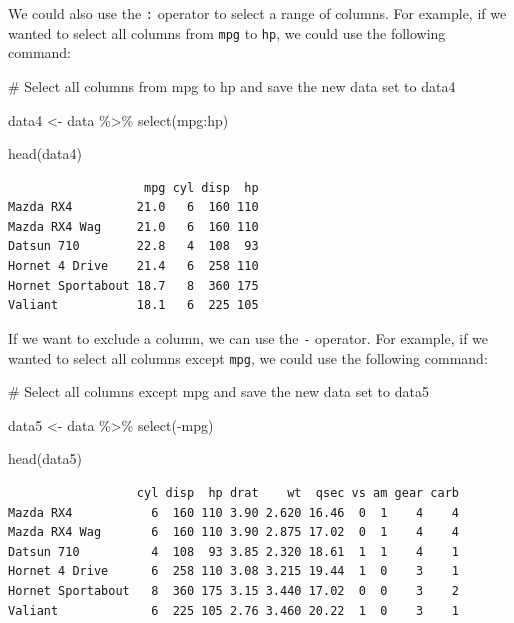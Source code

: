 \documentclass[
  letterpaper,
  DIV=11,
  numbers=noendperiod]{scrreprt}
\newenvironment{Shaded}{\begin{snugshade}}{\end{snugshade}}
\newcommand{\CommentTok}[1]{\textcolor[rgb]{0.37,0.37,0.37}{#1}}
\newcommand{\FunctionTok}[1]{\textcolor[rgb]{0.28,0.35,0.67}{#1}}
\newcommand{\NormalTok}[1]{\textcolor[rgb]{0.00,0.23,0.31}{#1}}
\newcommand{\OtherTok}[1]{\textcolor[rgb]{0.00,0.23,0.31}{#1}}
\newcommand{\SpecialCharTok}[1]{\textcolor[rgb]{0.37,0.37,0.37}{#1}}
\begin{document}
We could also use the \texttt{:} operator to select a range of columns.
For example, if we wanted to select all columns from \texttt{mpg} to
\texttt{hp}, we could use the following command:

\begin{Shaded}
\begin{Highlighting}[]
\CommentTok{\# Select all columns from mpg to hp and save the new data set to data4}

\NormalTok{data4 }\OtherTok{\textless{}{-}}\NormalTok{ data }\SpecialCharTok{\%\textgreater{}\%}
  \FunctionTok{select}\NormalTok{(mpg}\SpecialCharTok{:}\NormalTok{hp)}

\FunctionTok{head}\NormalTok{(data4)}
\end{Highlighting}
\end{Shaded}

\begin{verbatim}
                   mpg cyl disp  hp
Mazda RX4         21.0   6  160 110
Mazda RX4 Wag     21.0   6  160 110
Datsun 710        22.8   4  108  93
Hornet 4 Drive    21.4   6  258 110
Hornet Sportabout 18.7   8  360 175
Valiant           18.1   6  225 105
\end{verbatim}

If we want to exclude a column, we can use the \texttt{-} operator. For
example, if we wanted to select all columns except \texttt{mpg}, we
could use the following command:

\begin{Shaded}
\begin{Highlighting}[]
\CommentTok{\# Select all columns except mpg and save the new data set to data5}

\NormalTok{data5 }\OtherTok{\textless{}{-}}\NormalTok{ data }\SpecialCharTok{\%\textgreater{}\%}
  \FunctionTok{select}\NormalTok{(}\SpecialCharTok{{-}}\NormalTok{mpg)}

\FunctionTok{head}\NormalTok{(data5)}
\end{Highlighting}
\end{Shaded}

\begin{verbatim}
                  cyl disp  hp drat    wt  qsec vs am gear carb
Mazda RX4           6  160 110 3.90 2.620 16.46  0  1    4    4
Mazda RX4 Wag       6  160 110 3.90 2.875 17.02  0  1    4    4
Datsun 710          4  108  93 3.85 2.320 18.61  1  1    4    1
Hornet 4 Drive      6  258 110 3.08 3.215 19.44  1  0    3    1
Hornet Sportabout   8  360 175 3.15 3.440 17.02  0  0    3    2
Valiant             6  225 105 2.76 3.460 20.22  1  0    3    1
\end{verbatim}
\end{document}
